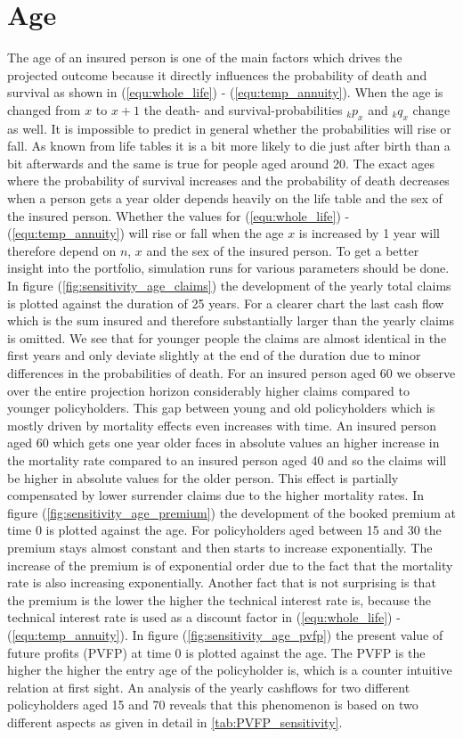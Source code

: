 \section{Age}
\label{sec:age} 
The age of an insured person is one of the main factors which drives the projected outcome because it directly influences the probability of death and survival as shown in (\ref{equ:whole_life}) - (\ref{equ:temp_annuity}). When the age is changed from $x$ to $x+1$ the death- and survival-probabilities ${}_{k}p_x$ and ${}_{k}q_x$ change as well. It is impossible to predict in general whether the probabilities will rise or fall. As known from life tables it is a bit more likely to die just after birth than a bit afterwards and the same is true for people aged around 20. The exact ages where the probability of survival increases and the probability of death decreases when a person gets a year older depends heavily on the life table and the sex of the insured person. Whether the values for (\ref{equ:whole_life}) - (\ref{equ:temp_annuity}) will rise or fall when the age $x$ is increased by 1 year will therefore depend on $n$, $x$ and the sex of the insured person. To get a better insight into the portfolio, simulation runs for various parameters should be done. In figure (\ref{fig:sensitivity_age_claims}) the development of the yearly total claims is plotted against the duration of 25 years. For a clearer chart the last cash flow which is the sum insured and therefore substantially larger than the yearly claims is omitted. We see that for younger people the claims are almost identical in the first years and only deviate slightly at the end of the duration due to minor differences in the probabilities of death. For an insured person aged 60 we observe over the entire projection horizon considerably higher claims compared to younger policyholders. This gap between young and old policyholders which is mostly driven by mortality effects even increases with time. An insured person aged 60 which gets one year older faces in absolute values an higher increase in the mortality rate compared to an insured person aged 40 and so the claims will be higher in absolute values for the older person. This effect is partially compensated by lower surrender claims due to the higher mortality rates. In figure  (\ref{fig:sensitivity_age_premium}) the development of the booked premium at time 0 is plotted against the age. For policyholders aged between 15 and 30 the premium stays almost constant and then starts to increase exponentially. The increase of the premium is of exponential order due to the fact that the mortality rate is also increasing exponentially. Another fact that is not surprising is that the premium is the lower the higher the technical interest rate is, because the technical interest rate is used as a discount factor in (\ref{equ:whole_life}) - (\ref{equ:temp_annuity}). In figure  (\ref{fig:sensitivity_age_pvfp}) the present value of future profits (PVFP) at time 0 is plotted against the age. The PVFP is the higher the higher the entry age of the policyholder is, which is a counter intuitive relation at first sight. An analysis of the yearly cashflows for two different policyholders aged 15 and 70 reveals that this phenomenon is based on two different aspects as given in detail in \ref{tab:PVFP_sensitivity}. 
